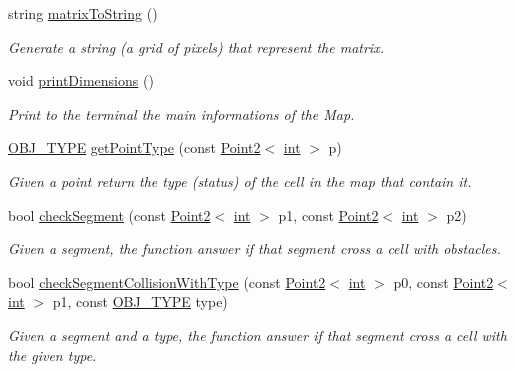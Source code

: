 \begin{DoxyCompactItemize}
string \mbox{\hyperlink{class_mapp_ad38f31eac2ad66836325c152db1f88c3}{matrix\+To\+String}} ()
\begin{DoxyCompactList}\small\item\em Generate a string (a grid of pixels) that represent the matrix. \end{DoxyCompactList}\item 
void \mbox{\hyperlink{class_mapp_a0405773fd644d183c603b569e9957248}{print\+Dimensions}} ()
\begin{DoxyCompactList}\small\item\em Print to the terminal the main informations of the Map. \end{DoxyCompactList}\item 
\mbox{\hyperlink{map_8hh_a714b9c2c276fbae637fee36453d9121e}{O\+B\+J\+\_\+\+T\+Y\+PE}} \mbox{\hyperlink{class_mapp_af00af0c0dce4cf7dd235c81ec256f024}{get\+Point\+Type}} (const \mbox{\hyperlink{class_point2}{Point2}}$<$ \mbox{\hyperlink{draw_8hh_aa620a13339ac3a1177c86edc549fda9b}{int}} $>$ p)
\begin{DoxyCompactList}\small\item\em Given a point return the type (status) of the cell in the map that contain it. \end{DoxyCompactList}\item 
bool \mbox{\hyperlink{class_mapp_a5822c592a262a14c6aa009f9863e6971}{check\+Segment}} (const \mbox{\hyperlink{class_point2}{Point2}}$<$ \mbox{\hyperlink{draw_8hh_aa620a13339ac3a1177c86edc549fda9b}{int}} $>$ p1, const \mbox{\hyperlink{class_point2}{Point2}}$<$ \mbox{\hyperlink{draw_8hh_aa620a13339ac3a1177c86edc549fda9b}{int}} $>$ p2)
\begin{DoxyCompactList}\small\item\em Given a segment, the function answer if that segment cross a cell with obstacles. \end{DoxyCompactList}\item 
bool \mbox{\hyperlink{class_mapp_abd0b6f51b6661c43a49a9b8df23094f7}{check\+Segment\+Collision\+With\+Type}} (const \mbox{\hyperlink{class_point2}{Point2}}$<$ \mbox{\hyperlink{draw_8hh_aa620a13339ac3a1177c86edc549fda9b}{int}} $>$ p0, const \mbox{\hyperlink{class_point2}{Point2}}$<$ \mbox{\hyperlink{draw_8hh_aa620a13339ac3a1177c86edc549fda9b}{int}} $>$ p1, const \mbox{\hyperlink{map_8hh_a714b9c2c276fbae637fee36453d9121e}{O\+B\+J\+\_\+\+T\+Y\+PE}} type)
\begin{DoxyCompactList}\small\item\em Given a segment and a type, the function answer if that segment cross a cell with the given type. \end{DoxyCompactList}\end{DoxyCompactItemize}
